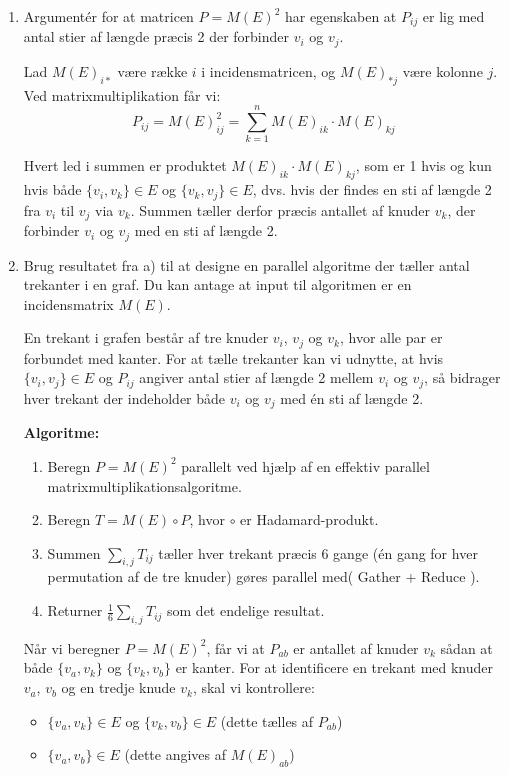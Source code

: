 \documentclass{article}
\theoremstyle{definition}
\begin{document}
\begin{enumerate}[label=\alph*)]
\item Argumentér for at matricen $P = M(E)^2$ har egenskaben at $P_{ij}$ er lig med antal stier af længde præcis 2 der forbinder $v_i$ og $v_j$.

Lad $M(E)_{i*}$ være række $i$ i incidensmatricen, og $M(E)_{*j}$ være kolonne $j$. Ved matrixmultiplikation får vi:
$$P_{ij} = M(E)^2_{ij} = \sum_{k=1}^{n} M(E)_{ik} \cdot M(E)_{kj}$$

Hvert led i summen er produktet $M(E)_{ik} \cdot M(E)_{kj}$, som er 1 hvis og kun hvis både $\{v_i, v_k\} \in E$ og $\{v_k, v_j\} \in E$, dvs. hvis der findes en sti af længde 2 fra $v_i$ til $v_j$ via $v_k$. Summen tæller derfor præcis antallet af knuder $v_k$, der forbinder $v_i$ og $v_j$ med en sti af længde 2.

\item Brug resultatet fra a) til at designe en parallel algoritme der tæller antal trekanter i en graf. Du kan antage at input til algoritmen er en incidensmatrix $M(E)$.

En trekant i grafen består af tre knuder $v_i$, $v_j$ og $v_k$, hvor alle par er forbundet med kanter. For at tælle trekanter kan vi udnytte, at hvis $\{v_i, v_j\} \in E$ og $P_{ij}$ angiver antal stier af længde 2 mellem $v_i$ og $v_j$, så bidrager hver trekant der indeholder både $v_i$ og $v_j$ med én sti af længde 2.

\textbf{Algoritme:}
\begin{enumerate}
\item Beregn $P = M(E)^2$ parallelt ved hjælp af en effektiv parallel matrixmultiplikationsalgoritme.
\item Beregn $T = M(E) \circ P$, hvor $\circ$ er Hadamard-produkt.
\item Summen $\sum_{i,j} T_{ij}$ tæller hver trekant præcis 6 gange (én gang for hver permutation af de tre knuder) gøres parallel med( Gather + Reduce ).
\item Returner $\frac{1}{6}\sum_{i,j} T_{ij}$ som det endelige resultat.
\end{enumerate}

Når vi beregner $P = M(E)^2$, får vi at $P_{ab}$ er antallet af knuder $v_k$ sådan at både $\{v_a, v_k\}$ og $\{v_k, v_b\}$ er kanter. For at identificere en trekant med knuder $v_a$, $v_b$ og en tredje knude $v_k$, skal vi kontrollere:
\begin{itemize}
\item $\{v_a, v_k\} \in E$ og $\{v_k, v_b\} \in E$ (dette tælles af $P_{ab}$)
\item $\{v_a, v_b\} \in E$ (dette angives af $M(E)_{ab}$)
\end{itemize}


\end{enumerate}
\end{document}
